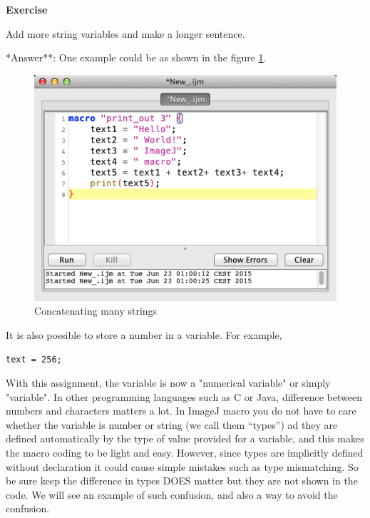 \documentclass[11pt,a4paper,oneside]{report}
\newenvironment{indentexercise}[1]
{{\setlength{\leftmargin}{2em}}
\textbf{Exercise \thesubsection-#1}
\begin{list}{}
	\item
}
{\end{list}}
\begin{document}
\begin{indentexercise}{1}
\item Add more string variables and make a longer sentence.\\

\item **Answer**: One example could be as shown in the figure \ref{var_stringconcat}. 
\begin{figure}[htbp]
\begin{center}
\includegraphics[scale=0.6]{fig/var_stringContcat.png}
\caption{Concatenating many strings} \label{var_stringconcat}
\end{center}
\end{figure}

\end{indentexercise}


It is also possible to store a number in a variable. For example, \\
\begin{lstlisting}[numbers=none]
text = 256;
\end{lstlisting}
With this assignment, the variable is now a "numerical variable" or simply "variable". 
In other programming languages such as C or Java, difference between numbers and characters matters a lot. 
In ImageJ macro you do not have to care whether the variable is number or string (we call them ``types'') ad they are defined automatically by the type of value provided for a variable, and this makes the macro coding to be light and easy. However, since types are implicitly defined without declaration it could cause simple mistakes such as type mismatching. 
So be sure keep the difference in types DOES matter but they are not shown in the code. We will see an example of such confusion, 
and also a way to avoid the confusion. 
\end{document}
